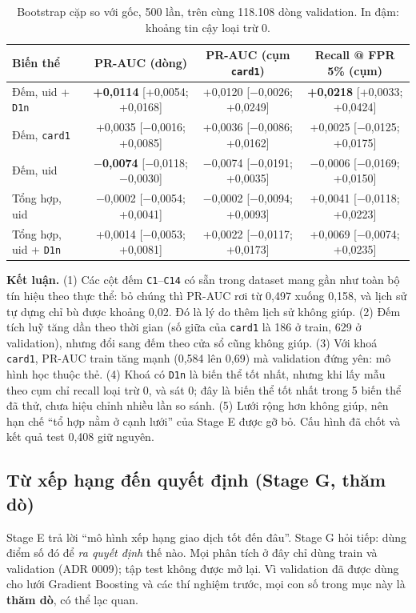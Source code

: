 \documentclass[11pt,a4paper]{article}
\newcommand{\code}[1]{\texttt{\small #1}}
\begin{document}
\begin{table}[H]\centering\footnotesize\setlength{\tabcolsep}{3pt}
\caption{Bootstrap cặp so với gốc, 500 lần, trên cùng 118.108 dòng validation. In đậm: khoảng tin cậy loại trừ 0.}
\begin{tabular}{@{}lccc@{}}
\toprule
Biến thể & PR-AUC (dòng) & PR-AUC (cụm \code{card1}) & Recall @ FPR 5\% (cụm) \\ \midrule
Đếm, uid + \code{D1n} & \textbf{+0,0114} [+0,0054; +0,0168] & +0,0120 [$-$0,0026; +0,0249] & \textbf{+0,0218} [+0,0033; +0,0424] \\
Đếm, \code{card1} & +0,0035 [$-$0,0016; +0,0085] & +0,0036 [$-$0,0086; +0,0162] & +0,0025 [$-$0,0125; +0,0175] \\
Đếm, uid & \textbf{$-$0,0074} [$-$0,0118; $-$0,0030] & $-$0,0074 [$-$0,0191; +0,0035] & $-$0,0006 [$-$0,0169; +0,0150] \\
Tổng hợp, uid & $-$0,0002 [$-$0,0054; +0,0041] & $-$0,0002 [$-$0,0094; +0,0093] & +0,0041 [$-$0,0118; +0,0223] \\
Tổng hợp, uid + \code{D1n} & +0,0014 [$-$0,0053; +0,0081] & +0,0022 [$-$0,0117; +0,0173] & +0,0069 [$-$0,0074; +0,0235] \\ \bottomrule
\end{tabular}
\end{table}

\begin{keypoint}
\textbf{Kết luận.} (1) Các cột đếm \code{C1}--\code{C14} có sẵn trong dataset mang gần như toàn bộ tín hiệu theo thực thể: bỏ chúng thì PR-AUC rơi từ 0,497 xuống 0,158, và lịch sử tự dựng chỉ bù được khoảng 0,02. Đó là lý do thêm lịch sử không giúp. (2) Đếm tích luỹ tăng dần theo thời gian (số giữa của \code{card1} là 186 ở train, 629 ở validation), nhưng đổi sang đếm theo cửa sổ cũng không giúp. (3) Với khoá \code{card1}, PR-AUC train tăng mạnh (0,584 lên 0,69) mà validation đứng yên: mô hình học thuộc thẻ. (4) Khoá có \code{D1n} là biến thể tốt nhất, nhưng khi lấy mẫu theo cụm chỉ recall loại trừ 0, và sát 0; đây là biến thể tốt nhất trong 5 biến thể đã thử, chưa hiệu chỉnh nhiều lần so sánh. (5) Lưới rộng hơn không giúp, nên hạn chế ``tổ hợp nằm ở cạnh lưới'' của Stage E được gỡ bỏ. Cấu hình đã chốt và kết quả test 0,408 giữ nguyên.
\end{keypoint}

\subsection{Từ xếp hạng đến quyết định (Stage G, thăm dò)}
Stage E trả lời ``mô hình xếp hạng giao dịch tốt đến đâu''. Stage G hỏi tiếp: dùng điểm số đó để \emph{ra quyết định} thế nào. Mọi phân tích ở đây chỉ dùng train và validation (ADR 0009); tập test không được mở lại. Vì validation đã được dùng cho lưới Gradient Boosting và các thí nghiệm trước, mọi con số trong mục này là \textbf{thăm dò}, có thể lạc quan.
\end{document}
